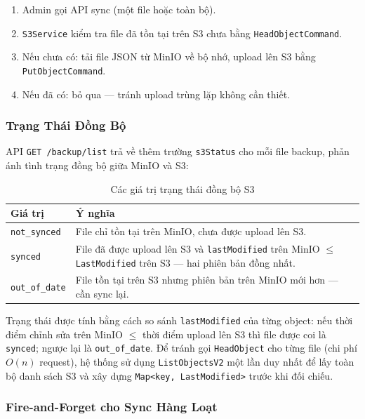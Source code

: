 \begin{enumerate}
    \item Admin gọi API sync (một file hoặc toàn bộ).
    \item \texttt{S3Service} kiểm tra file đã tồn tại trên S3 chưa bằng
    \texttt{HeadObjectCommand}.
    \item Nếu chưa có: tải file JSON từ MinIO về bộ nhớ, upload lên S3 bằng
    \texttt{PutObjectCommand}.
    \item Nếu đã có: bỏ qua — tránh upload trùng lặp không cần thiết.
\end{enumerate}

\subsubsection{Trạng Thái Đồng Bộ}

API \texttt{GET /backup/list} trả về thêm trường \texttt{s3Status} cho mỗi
file backup, phản ánh tình trạng đồng bộ giữa MinIO và S3:

\begin{table}[H]
\centering
\caption{Các giá trị trạng thái đồng bộ S3}
\label{tab:s3-status}
\renewcommand{\arraystretch}{1.4}
\begin{tabular}{|l|p{9cm}|}
\hline
\textbf{Giá trị} & \textbf{Ý nghĩa} \\
\hline
\texttt{not\_synced}
    & File chỉ tồn tại trên MinIO, chưa được upload lên S3. \\
\hline
\texttt{synced}
    & File đã được upload lên S3 và \texttt{lastModified} trên MinIO
      $\leq$ \texttt{LastModified} trên S3 — hai phiên bản đồng nhất. \\
\hline
\texttt{out\_of\_date}
    & File tồn tại trên S3 nhưng phiên bản trên MinIO mới hơn —
      cần sync lại. \\
\hline
\end{tabular}
\end{table}

Trạng thái được tính bằng cách so sánh \texttt{lastModified} của từng object:
nếu thời điểm chỉnh sửa trên MinIO $\leq$ thời điểm upload lên S3 thì
file được coi là \texttt{synced}; ngược lại là \texttt{out\_of\_date}.
Để tránh gọi \texttt{HeadObject} cho từng file (chi phí $O(n)$ request),
hệ thống sử dụng \texttt{ListObjectsV2} một lần duy nhất để lấy toàn bộ
danh sách S3 và xây dựng \texttt{Map<key, LastModified>} trước khi đối chiếu.

\subsubsection{Fire-and-Forget cho Sync Hàng Loạt}

